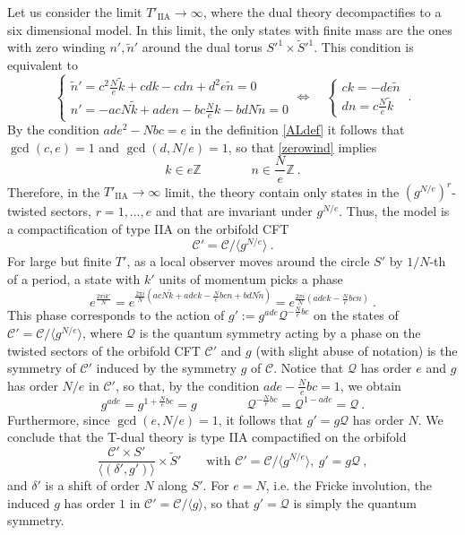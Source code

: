 \documentclass[a4paper,11pt]{article}
\newcommand{\ZZ}{\mathbb{Z}}
\newcommand{\C}{\mathcal{C}}
\newcommand{\Q}{\mathcal{Q}}
\numberwithin{equation}{section}
\def\be{\begin{equation}}
\def\ee{\end{equation}}
\begin{document}
Let us consider the limit $T'_{\text{IIA}}\to \infty$, where the dual theory  decompactifies to a six dimensional model. In this limit, the only states with finite mass are the ones with zero winding $n',\tilde n'$ around the dual torus $S'^1\times \tilde S'^1$. This condition is equivalent to
\be\label{zerowind}
\begin{cases} \tilde n'= c^2 \frac{N}{e}\tilde k+c d k-c d n+d^2 e \tilde n=0\\
 n'= -a c N \tilde k+a d e n-b c \frac{ N}{e}k-b d N \tilde n=0
\end{cases}\Leftrightarrow\quad
\begin{cases}ck=-de\tilde n\\ dn=c\frac{N}{e}\tilde k
\end{cases}\ .
\ee By the condition $ade^2-Nbc=e$ in the definition \eqref{ALdef} it follows that $\gcd(c,e)=1$ and $\gcd(d,N/e)=1$, so that \eqref{zerowind} implies
\be k\in e\ZZ\qquad\qquad n\in \frac{N}{e}\ZZ\ .
\ee
Therefore, in the $T'_{\text{IIA}}\to \infty$ limit, the theory contain only states in the $(g^{N/e})^r$-twisted sectors, $r=1,\ldots, e$ and that are invariant under $g^{N/e}$. Thus, the model is a compactification of type IIA on the orbifold CFT
\be \C'=\C/\langle g^{N/e}\rangle\ .
\ee For large but finite $T'$, as a local observer moves around the circle $S'$ by $1/N$-th of a period, a state with  $k'$ units of momentum picks a phase
\be e^{\frac{2\pi i k'}{N}}=e^{\frac{2\pi i}{N}(a c N \tilde k+a d e k-\frac{N}{e}bc n+b d N \tilde n)}=e^{\frac{2\pi i}{N}(ade k-\frac{N}{e}bc n)}\ .
\ee This phase corresponds to the action of $g':=g^{ade}\Q^{-\frac{N}{e}bc}$ on the states of $\C'=\C/\langle g^{N/e}\rangle$, where $\Q$ is the quantum symmetry acting by a phase on the twisted sectors of the orbifold CFT $\C'$ and $g$ (with slight abuse of notation) is the symmetry of $\C'$ induced by the symmetry $g$ of $\C$. Notice that $\Q$ has order $e$ and $g$ has order $N/e$ in $\C'$, so that, by the condition $ade-\frac{N}{e}bc=1$, we obtain \be g^{ade}=g^{1+\frac{N}{e}bc}=g\qquad\qquad \Q^{-\frac{N}{e}bc}=\Q^{1-ade}=\Q\ .\ee Furthermore, since $\gcd(e,N/e)=1$, it follows that $g'=g\Q$ has order $N$. We conclude that the T-dual theory is type IIA compactified on the orbifold
\be \frac{\C'\times S'}{\langle (\delta',g')\rangle}\times \tilde S'\qquad \text{with } \C'=\C/\langle g^{N/e}\rangle,\ g'=g\Q\ ,
\ee and $\delta'$ is a shift of order $N$ along $S'$. For $e=N$, i.e. the Fricke involution, the induced $g$ has order $1$ in $\C'=\C/\langle g\rangle$, so that $g'=\Q$ is simply the quantum symmetry.
\end{document}
